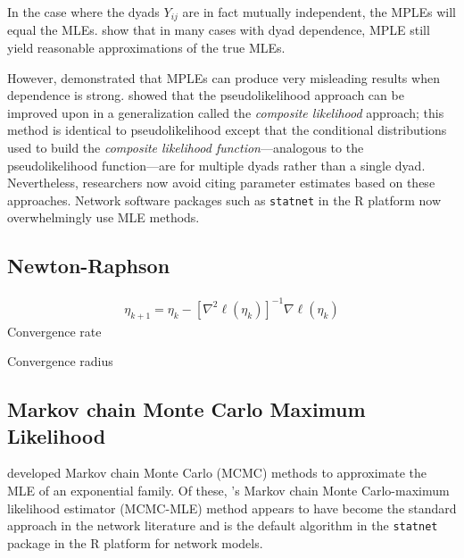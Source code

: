 In the case where the dyads $Y_{ij}$ are in fact mutually independent, the MPLEs will equal the MLEs.  
\citet{Strauss:1990} show that in 
many cases with dyad dependence, MPLE still yield reasonable approximations of the 
true MLEs.  

However, \citet*{Geyer:1992, Snijders:2002, Duijn:2009} demonstrated that 
MPLEs can produce very misleading results when dependence is strong.  
\citet*{Composite} showed that the pseudolikelihood approach can be 
improved upon in a generalization 
called the \emph{composite likelihood} approach; this method is identical
to pseudolikelihood except that the conditional distributions used to build the \emph{composite likelihood function}---analogous to the pseudolikelihood function---are for multiple dyads rather than a single dyad.
Nevertheless, researchers now avoid citing parameter estimates based on these approaches.
Network software packages such as \texttt{statnet} \citep*{statnet:R} in the R 
platform now overwhelmingly use MLE methods.  


\subsection{Newton-Raphson}
\begin{align}
	\eta_{k+1} = \eta_k - \left[ \nabla^2 \ell(\eta_k) \right ]^{-1} \nabla \ell(\eta_k) 	
\end{align}
Convergence rate

Convergence radius


\subsection{Markov chain Monte Carlo Maximum Likelihood} \label{S:MCMC-MLE}
\citet{Geyer:1992, Corander:1998, Snijders:2002} developed Markov chain Monte Carlo 
(MCMC) methods to approximate the MLE of an exponential family.  Of these, \citeauthor
{Geyer:1992}'s Markov chain Monte Carlo-maximum likelihood estimator (MCMC-MLE) method 
appears to have become the standard approach in the network literature 
\citep{Hunter:2006, Handcock:2006, GOF} and is the default algorithm in 
the \texttt{statnet} package \citep{statnet:R} in the R platform for network models.  

